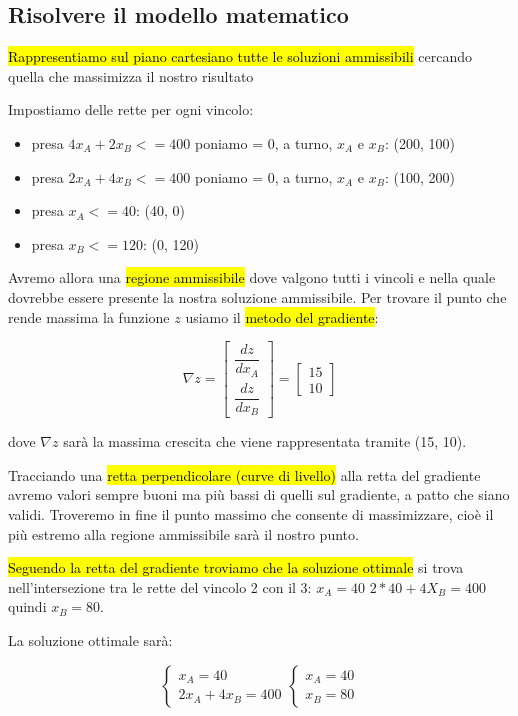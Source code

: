 \subsection{Risolvere il modello matematico}

\hl{Rappresentiamo sul piano cartesiano tutte le soluzioni ammissibili} cercando quella che massimizza il nostro risultato

Impostiamo delle rette per ogni vincolo:

\begin{itemize}
	\item presa $4x_A+2x_B <= 400$ poniamo = 0, a turno, $x_A$ e $x_B$: (200, 100)
	\item presa $2x_A+4x_B <= 400$ poniamo = 0, a turno, $x_A$ e $x_B$: (100, 200)
	\item presa $x_A <= 40$: (40, 0)
	\item presa $x_B <= 120$: (0, 120)
\end{itemize}


Avremo allora una \hl{regione ammissibile} dove valgono tutti i vincoli e nella quale dovrebbe essere presente la nostra soluzione ammissibile. Per trovare il punto che rende massima la funzione $z$ usiamo il \hl{metodo del gradiente}:

$$\nabla z = \left[\begin{array}{c}
	\dfrac{dz}{dx_A}\\
	\dfrac{dz}{dx_B}
\end{array}\right] = \left[\begin{array}{c}
	15\\
	10
\end{array}\right]
$$

dove $\nabla z$ sarà la massima crescita che viene rappresentata tramite (15, 10).

Tracciando una \hl{retta perpendicolare (curve di livello)} alla retta del gradiente avremo valori sempre buoni ma più bassi di quelli sul gradiente, a patto che siano validi. Troveremo in fine il punto massimo che consente di massimizzare, cioè il più estremo alla regione ammissibile sarà il nostro punto.

\hl{Seguendo la retta del gradiente troviamo che la soluzione ottimale} si trova nell'intersezione tra le rette del vincolo 2 con il 3: $x_A = 40$ $2*40+4X_B=400$ quindi $x_B=80$.

La soluzione ottimale sarà:

$$\begin{cases} 
    x_A = 40 \\ 
    2x_A+4x_B = 400
\end{cases}
\begin{cases} 
    x_A = 40 \\ 
    x_B = 80
\end{cases}$$


